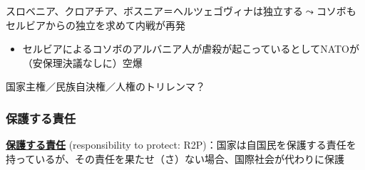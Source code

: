 \documentclass[
  xelatex,
  ja=standard]{bxjsarticle}
\providecommand{\tightlist}{%
  \setlength{\itemsep}{0pt}\setlength{\parskip}{0pt}}\usepackage{longtable,booktabs,array}
\begin{document}
スロベニア、クロアチア、ボスニア＝ヘルツェゴヴィナは独立する\(\leadsto\)コソボもセルビアからの独立を求めて内戦が再発

\begin{itemize}
\tightlist
\item
  セルビアによるコソボのアルバニア人が虐殺が起こっているとしてNATOが（安保理決議なしに）空爆
\end{itemize}

国家主権／民族自決権／人権のトリレンマ？

\hypertarget{ux4fddux8b77ux3059ux308bux8cacux4efb}{%
\subsubsection{保護する責任}\label{ux4fddux8b77ux3059ux308bux8cacux4efb}}

\href{https://ir.library.osaka-u.ac.jp/repo/ouka/all/67203/}{\textbf{保護する責任}}
(responsibility to protect:
R2P)：国家は自国民を保護する責任を持っているが、その責任を果たせ（さ）ない場合、国際社会が代わりに保護
\end{document}
